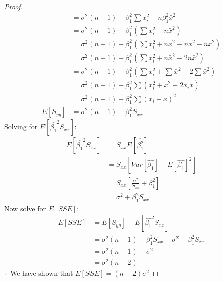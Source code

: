 \documentclass[12pt]{article}
\begin{document}
\begin{enumerate}[1.]
\begin{enumerate}[(a)]
\begin{proof}
\begin{align*}
                    &= \sigma^2(n - 1)+ \beta_1^2 \sum x_i^2 - n\beta_1^2 \bar{x}^2 \\
                    &= \sigma^2(n - 1)+ \beta_1^2 (\sum x_i^2 - n\bar{x}^2) \\
                    &= \sigma^2(n - 1)+ \beta_1^2 (\sum x_i^2 + n\bar{x}^2 - n\bar{x}^2 - n\bar{x}^2) \\
                    &= \sigma^2(n - 1)+ \beta_1^2 (\sum x_i^2 + n\bar{x}^2 - 2n\bar{x}^2) \\
                    &= \sigma^2(n - 1)+ \beta_1^2 (\sum x_i^2 + \sum\bar{x}^2 - 2\sum\bar{x}^2) \\
                    &= \sigma^2(n - 1)+ \beta_1^2 \sum (x_i^2 + \bar{x}^2 - 2x_i \bar{x}) \\
                    &= \sigma^2(n - 1)+ \beta_1^2 \sum (x_i - \bar{x})^2 \\
                    E[S_{yy}] &= \sigma^2(n - 1)+ \beta_1^2 S_{xx}
                \end{align*}
                Solving for $E[\hat{\beta_1}^2 S_{xx}]$:
                \begin{align*}
                    E[\hat{\beta_1}^2 S_{xx}] &= S_{xx} E[\hat{\beta_1^2}] \\
                    &= S_{xx} \left[Var[ \hat{\beta_1}] + E[\hat{\beta_1}]^2 \right]  \\
                    &= S_{xx} \left[ \frac{\sigma^2}{S_{xx}} + \beta_1^2 \right] \\
                    &= \sigma^2 + \beta_1^2 S_{xx}
                \end{align*}
                Now solve for $E[SSE]$:
                \begin{align*}
                    E[SSE] &= E[S_{yy}] - E[\hat{\beta_1}^2 S_{xx}] \\
                    &= \sigma^2(n - 1)+ \beta_1^2 S_{xx} - \sigma^2 - \beta_1^2 S_{xx} \\
                    &= \sigma^2(n - 1) - \sigma^2 \\
                    &= \sigma^2(n - 2)
                \end{align*}
                $\therefore$ We have shown that $E[SSE] = (n - 2)\sigma^2$
            \end{proof}
        \end{enumerate}
        

\end{enumerate}
\end{document}
